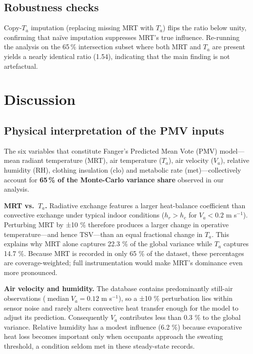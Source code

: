 \documentclass{article}
\theoremstyle{plain}
\theoremstyle{definition}
\theoremstyle{remark}
\begin{document}
\subsection{Robustness checks}\label{ssec:ablate}
Copy-$T_a$ imputation (replacing missing MRT with $T_a$) flips the ratio below unity, confirming that naïve imputation suppresses MRT’s true influence.  Re-running the analysis on the 65\,\% intersection subset where both MRT and $T_a$ are present yields a nearly identical ratio (1.54), indicating that the main finding is not artefactual.

\section{Discussion}\label{sec:discuss}

\subsection{Physical interpretation of the PMV inputs}\label{ssec:pmv}

The six variables that constitute Fanger’s Predicted Mean Vote (PMV) model—mean radiant temperature (MRT), air temperature ($T_a$), air velocity ($V_a$), relative humidity (RH), clothing insulation (clo) and metabolic rate (met)—collectively account for \textbf{65\,\% of the Monte-Carlo variance share} observed in our analysis.

\textbf{MRT vs.\ $T_a$.}  Radiative exchange features a larger heat-balance coefficient than convective exchange under typical indoor conditions ($h_r\!>\!h_c$ for $V_a<0.2$ m s\(^{-1}\)). Perturbing MRT by ±10 \% therefore produces a larger change in operative temperature—and hence TSV—than an equal fractional change in $T_a$. This explains why MRT alone captures 22.3 \% of the global variance while $T_a$ captures 14.7 \%. Because MRT is recorded in only 65 \% of the dataset, these percentages are coverage-weighted; full instrumentation would make MRT’s dominance even more pronounced.

\textbf{Air velocity and humidity.}  The database contains predominantly still-air observations ($\operatorname{median} V_a\!=\!0.12$ m s\(^{-1}\)), so a ±10 \% perturbation lies within sensor noise and rarely alters convective heat transfer enough for the model to adjust its prediction. Consequently $V_a$ contributes less than 0.3 \% to the global variance. Relative humidity has a modest influence (6.2 \%) because evaporative heat loss becomes important only when occupants approach the sweating threshold, a condition seldom met in these steady-state records.
\end{document}
